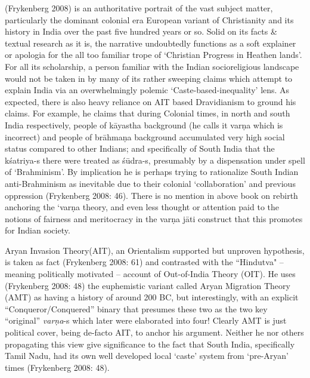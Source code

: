 (Frykenberg 2008) is an authoritative portrait of the vast subject matter, particularly the dominant colonial era European variant of Christianity and its history in India over the past five hundred years or so. Solid on its facts \& textual research as it is, the narrative undoubtedly functions as a soft explainer or apologia for the all too familiar trope of ‘Christian Progress in Heathen lands’. For all its scholarship, a person familiar with the Indian socioreligious landscape would not be taken in by many of its rather sweeping claims which attempt to explain India via an overwhelmingly polemic ‘Caste-based-inequality’ lens. As expected, there is also heavy reliance on AIT based Dravidianism to ground his claims. For example, he claims that during Colonial times, in north and south India respectively, people of kāyastha background (he calls it varṇa which is incorrect) and people of brāhmaṇa background accumulated very high social status compared to other Indians; and specifically of South India that the kśatriya-s there were treated as śūdra-s, presumably by a dispensation under spell of ‘Brahminism’. By implication he is perhaps trying to rationalize South Indian anti-Brahminism as inevitable due to their colonial ‘collaboration’ and previous oppression (Frykenberg 2008: 46). There is no mention in above book on rebirth anchoring the ‘varṇa theory, and even less thought or attention paid to the notions of fairness and meritocracy in the varṇa jāti construct that this promotes for Indian society.

Aryan Invasion Theory(AIT), an Orientalism supported but unproven hypothesis, is taken as fact (Frykenberg 2008: 61) and contrasted with the “Hindutva" – meaning politically motivated – account of Out-of-India Theory (OIT). He uses (Frykenberg 2008: 48) the euphemistic variant called Aryan Migration Theory (AMT) as having a history of around 200 BC, but interestingly, with an explicit “Conqueror/Conquered” binary that presumes these two as the two key “original” \textit{varṇa}-s which later were elaborated into four! Clearly AMT is just political cover, being de-facto AIT, to anchor his argument. Neither he nor others propagating this view give significance to the fact that South India, specifically Tamil Nadu, had its own well developed local ‘caste’ system from ‘pre-Aryan’ times (Frykenberg 2008: 48).

